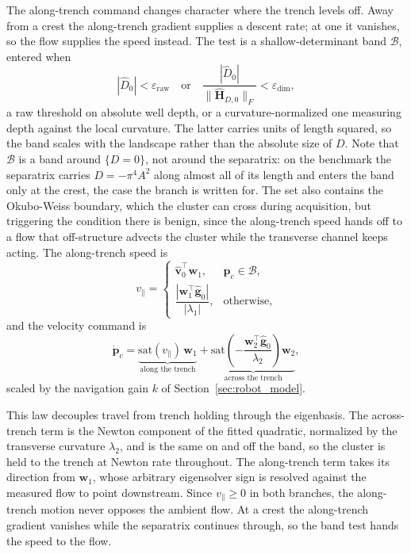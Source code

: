 \documentclass[lettersize,journal]{IEEEtran}
\begin{document}
The along-trench command changes character where the trench levels off.
Away from a crest the along-trench gradient supplies a descent rate; at
one it vanishes, so the flow supplies the speed instead. The test is a shallow-determinant band $\mathcal{B}$, entered when
\begin{equation}
    |\hat{D}_0| < \varepsilon_{\mathrm{raw}}
    \quad\text{or}\quad
    \frac{|\hat{D}_0|}{\|\hat{\mathbf{H}}_{D,0}\|_F}
        < \varepsilon_{\dim},
\end{equation}
a raw threshold on absolute well depth, or a curvature-normalized one measuring depth against the local curvature. The latter carries units of length squared, so the band scales with the landscape rather than the absolute size of $D$. Note that $\mathcal{B}$ is a band around
$\{D = 0\}$, not around the separatrix: on the benchmark the separatrix
carries $D = -\pi^4 A^2$ along almost all of its length and enters the
band only at the crest, the case the branch is written for. The set
also contains the Okubo-Weiss boundary, which the cluster can cross
during acquisition, but triggering the condition there is benign, since the
along-trench speed hands off to a flow that off-structure advects the
cluster while the transverse channel keeps acting. The
along-trench speed is
\begin{equation}
    v_\parallel =
    \begin{cases}
        \hat{\mathbf{v}}_0^\top \mathbf{w}_1,
            & \mathbf{p}_c \in \mathcal{B}, \\[6pt]
        \dfrac{|\mathbf{w}_1^\top \hat{\mathbf{g}}_0|}{|\lambda_1|},
            & \text{otherwise},
    \end{cases}
    \label{eq:vpar}
\end{equation}
and the velocity command is
\begin{equation}
    \dot{\mathbf{p}}_c =
    \underbrace{\mathrm{sat}(v_\parallel)\,\mathbf{w}_1}_{\text{along the trench}}
    + \underbrace{\mathrm{sat}\!\left(-\frac{\mathbf{w}_2^\top
      \hat{\mathbf{g}}_0}{\lambda_2}\right)\mathbf{w}_2}_{\text{across the trench}},
    \label{eq:d_law}
\end{equation}
scaled by the navigation gain $k$ of Section~\ref{sec:robot_model}.

This law decouples travel from trench holding through the eigenbasis.
The across-trench term is the Newton component of the fitted quadratic,
normalized by the transverse curvature $\lambda_2$, and is the same
on and off the band, so the cluster is held to the trench at Newton rate
throughout. The along-trench term takes its direction from $\mathbf{w}_1$, whose
arbitrary eigensolver sign is resolved against the measured flow to
point downstream. Since
$v_\parallel \geq 0$ in both branches, the
along-trench motion never opposes the ambient flow. At a crest the along-trench gradient vanishes while the separatrix
continues through, so the band test hands the speed to the flow.
\end{document}
